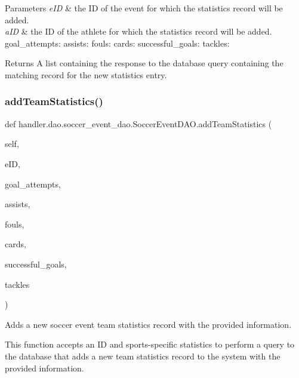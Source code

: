 \begin{DoxyParams}{Parameters}
{\em e\+ID} & the ID of the event for which the statistics record will be added. \\
\hline
{\em a\+ID} & the ID of the athlete for which the statistics record will be added. goal\+\_\+attempts\+: assists\+: fouls\+: cards\+: successful\+\_\+goals\+: tackles\+:\\
\hline
\end{DoxyParams}
\begin{DoxyReturn}{Returns}
A list containing the response to the database query containing the matching record for the new statistics entry. 
\end{DoxyReturn}
\mbox{\label{classhandler_1_1dao_1_1soccer__event__dao_1_1_soccer_event_d_a_o_ae52586194d67b1cb7190947805ccb144}} 
\subsubsection{\texorpdfstring{add\+Team\+Statistics()}{addTeamStatistics()}}
{\footnotesize\ttfamily def handler.\+dao.\+soccer\+\_\+event\+\_\+dao.\+Soccer\+Event\+D\+A\+O.\+add\+Team\+Statistics (\begin{DoxyParamCaption}\item[{}]{self,  }\item[{}]{e\+ID,  }\item[{}]{goal\+\_\+attempts,  }\item[{}]{assists,  }\item[{}]{fouls,  }\item[{}]{cards,  }\item[{}]{successful\+\_\+goals,  }\item[{}]{tackles }\end{DoxyParamCaption})}



Adds a new soccer event team statistics record with the provided information. 

This function accepts an ID and sports-\/specific statistics to perform a query to the database that adds a new team statistics record to the system with the provided information.


